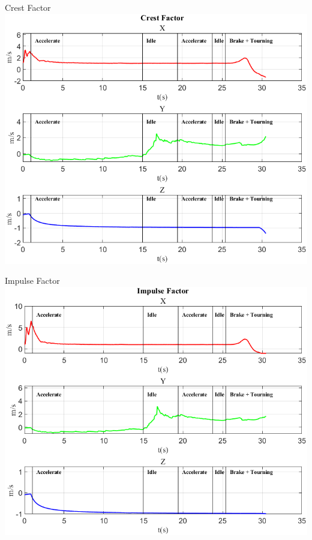 \documentclass[beamer]{standalone}
\begin{document}
	\begin{frame}{{Crest Factor}}
		\centering\includegraphics[height=.8\textheight]{figure/Vel/Crest Factor}
	\end{frame}
	
	\begin{frame}{{Impulse Factor}}
		\centering\includegraphics[height=.8\textheight]{figure/Vel/Impulse Factor}
	\end{frame}
	
\end{document}
